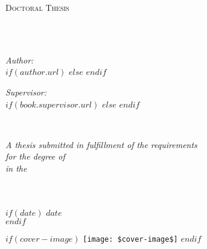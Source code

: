 \frontmatter %

\pagestyle{plain} %


\begin{titlepage}
\begin{center}

\vspace*{.06\textheight}
{\scshape\LARGE \univname\par}\vspace{1.5cm} %
\textsc{\Large Doctoral Thesis}\\[0.5cm] %

\HRule \\[0.4cm] %
{\huge \bfseries \ttitle\par}\vspace{0.4cm} %
\HRule \\[1.5cm] %
 
\begin{minipage}[t]{0.4\textwidth}
\begin{flushleft} \large
\emph{Author:}\\
$if(author.url)$
\href{$author.url$}{\authorname} %
$else$
\authorname
$endif$
\end{flushleft}
\end{minipage}
\begin{minipage}[t]{0.4\textwidth}
\begin{flushright} \large
\emph{Supervisor:} \\
$if(book.supervisor.url)$%
\href{$book.supervisor.url$}{\supname} %
$else$%
\supname
$endif$
\end{flushright}
\end{minipage}\\[3cm]
 
\vfill

\large \textit{A thesis submitted in fulfillment of the requirements\\ for the degree of \degreename}\\[0.3cm] %
\textit{in the}\\[0.4cm]
\groupname\\
\deptname\\[2cm] %
 
\vfill

$if(date)$
{\large $date$}\\[4cm] %
$endif$

$if(cover-image)$
\texttt{[image: \$cover-image\$]} %
$endif$
 
\vfill
\end{center}
\end{titlepage}

